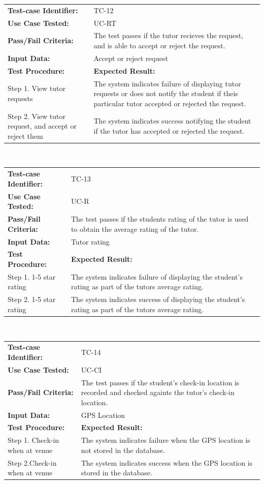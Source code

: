 \documentclass[12pt]{article}
\begin{document}
{\begin{tabular}{| p{8cm} | p{8cm} |} \hline
	\textbf{Test-case Identifier:}& TC-12\\
	\textbf{Use Case Tested:}& UC-RT\\
	\textbf{Pass/Fail Criteria:}& The test passes if the tutor recieves the request, and is able to accept or reject the request.\\
	\textbf{Input Data:}& Accept or reject request\\\hline
	\textbf{Test Procedure:}& \textbf{Expected Result:} \\\hline
	Step 1. View tutor requests & The system indicates failure of displaying tutor requests or does not notify the student if theis particular tutor accepted or rejected the request. \\
	Step 2. View tutor request, and accept or reject them & The system indicates success notifying the student if the tutor has accepted or rejected the request.\\
		\hline
\end{tabular}
\\

\begin{tabular}{| p{8cm} | p{8cm} |} \hline
	\textbf{Test-case Identifier:}& TC-13\\
	\textbf{Use Case Tested:}& UC-R\\
	\textbf{Pass/Fail Criteria:}& The test passes if the students rating of the tutor is used to obtain the average rating of the tutor.\\
	\textbf{Input Data:}& Tutor rating\\\hline
	\textbf{Test Procedure:}& \textbf{Expected Result:} \\\hline
	Step 1. 1-5 star rating & The system indicates failure of displaying the student's rating as part of the tutors average rating. \\
	Step 2. 1-5 star rating & The system indicates success of displaying the student's rating as part of the tutors average rating.\\
		\hline
\end{tabular}
\\

\begin{tabular}{| p{8cm} | p{8cm} |} \hline
	\textbf{Test-case Identifier:}& TC-14\\
	\textbf{Use Case Tested:}& UC-CI\\
	\textbf{Pass/Fail Criteria:}& The test passes if the student's check-in location is recorded and checked againts the tutor's check-in location.\\
	\textbf{Input Data:}& GPS Location\\\hline
	\textbf{Test Procedure:}& \textbf{Expected Result:} \\\hline
	Step 1. Check-in when at venue & The system indicates failure when the GPS location is not stored in the database. \\
	Step 2.Check-in when at venue & The system indicates success when the GPS location is  stored in the database.\\
		\hline
\end{tabular}
\\

}
\end{document}
